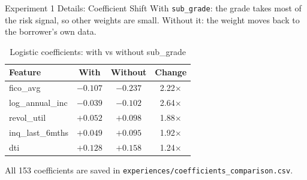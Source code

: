\documentclass{beamer}
\newcommand{\code}[1]{\texttt{\small #1}}
\begin{document}
\begin{frame}{Experiment 1 Details: Coefficient Shift}
  With \code{sub\_grade}: the grade takes most of the risk signal, so other weights are small. Without it: the weight moves back to the borrower's own data.
  \begin{table}
    \centering
    \tiny
    \caption{Logistic coefficients: with vs without sub\_grade}
    \begin{tabular}{lccc}
      \hline
      \textbf{Feature} & \textbf{With} & \textbf{Without} & \textbf{Change}\\
      \hline
      fico\_avg & $-0.107$ & $-0.237$ & 2.22$\times$\\
      log\_annual\_inc & $-0.039$ & $-0.102$ & 2.64$\times$\\
      revol\_util & $+0.052$ & $+0.098$ & 1.88$\times$\\
      inq\_last\_6mths & $+0.049$ & $+0.095$ & 1.92$\times$\\
      dti & $+0.128$ & $+0.158$ & 1.24$\times$\\
      \hline
    \end{tabular}
  \end{table}
  \scriptsize All 153 coefficients are saved in \code{experiences/coefficients\_comparison.csv}.
\end{frame}
\end{document}
